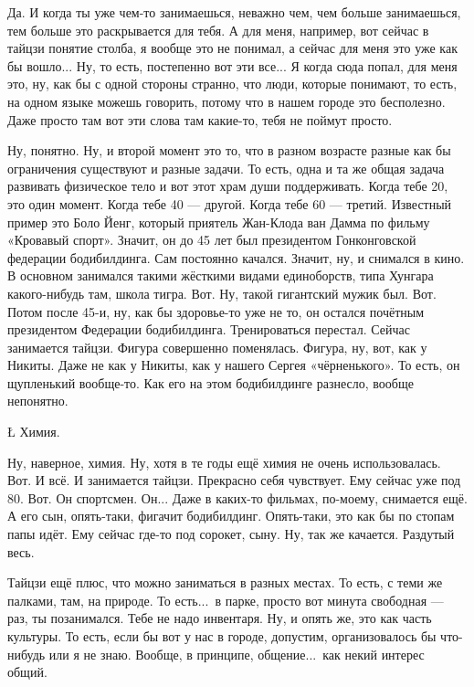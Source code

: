 \I
Да. И когда ты уже
чем-то занимаешься, неважно чем,
чем больше занимаешься, тем больше
это раскрывается для тебя.
А для меня, например,
вот сейчас в тайцзи
понятие столба, я вообще
это не понимал, а сейчас для меня
это уже как бы вошло... Ну, то есть,
постепенно вот эти все...
Я когда сюда попал, для меня это,
ну, как бы с одной стороны странно,
что люди, которые
понимают, то есть, на
одном языке можешь говорить,
потому что в нашем городе это бесполезно.
Даже просто там вот эти слова
там какие-то, тебя не поймут просто.

\A
Ну, понятно.
Ну, и второй момент это то, что
в разном возрасте разные
как бы ограничения
существуют и разные задачи.
То есть, одна и та же
общая задача
развивать физическое
тело и вот этот храм души
поддерживать.
Когда тебе
20, это
один момент. Когда тебе 40 --- другой.
Когда тебе 60 --- третий.
Известный пример это
Боло Йенг, который
приятель
Жан-Клода ван Дамма по фильму
«Кровавый спорт». Значит,
он до
45 лет
был президентом
Гонконговской федерации бодибилдинга.
Сам постоянно качался.
Значит,
ну, и снимался в кино.
В основном занимался
такими жёсткими видами
единоборств, типа Хунгара
какого-нибудь там, школа тигра.
Вот.
Ну, такой гигантский мужик был.
Вот. Потом
после 45-и,
ну, как бы здоровье-то уже не то,
он
остался почётным
президентом
Федерации бодибилдинга. Тренироваться
перестал. Сейчас
занимается тайцзи.
Фигура совершенно поменялась. Фигура,
ну, вот, как у Никиты.
Даже не как у Никиты,
как у нашего
Сергея «чёрненького».
То есть, он щупленький вообще-то.
Как его на этом бодибилдинге разнесло,
вообще непонятно.

\L
Химия.

\A
Ну, наверное,
химия. Ну, хотя в те годы
ещё химия не очень использовалась.
Вот. И всё. И занимается тайцзи.
Прекрасно себя чувствует. Ему сейчас уже
под 80. Вот. Он спортсмен.
Он... Даже в каких-то фильмах, по-моему, снимается ещё.
А его сын, опять-таки,
фигачит бодибилдинг.
Опять-таки, это как бы
по стопам папы идёт.
Ему сейчас где-то под
сорокет, сыну.
Ну, так же качается.
Раздутый весь.

\I
Тайцзи ещё плюс, что можно заниматься
в разных местах. То есть,
с теми же палками, там,
на природе. То есть...\
в парке, просто вот
минута свободная --- раз, ты позанимался.
Тебе не надо инвентаря.
Ну, и опять же, это как часть
культуры. То есть, если бы
вот у нас в городе, допустим,
организовалось бы что-нибудь или я не знаю.
Вообще, в принципе, общение...\
как некий интерес общий.

